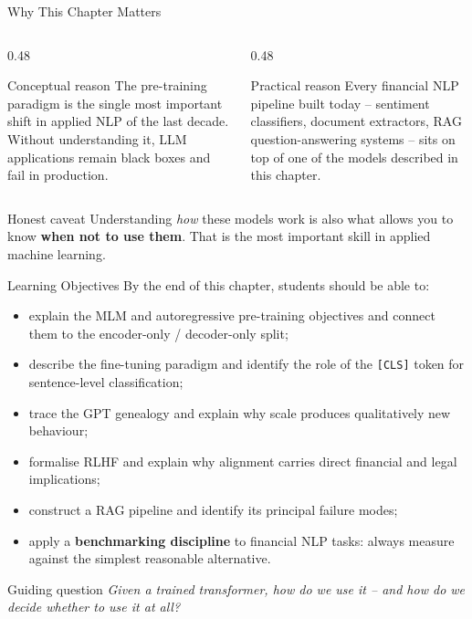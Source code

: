 \documentclass[11pt,aspectratio=169,professionalfonts]{beamer}
\begin{document}
\begin{frame}{Why This Chapter Matters}
  \begin{columns}[T]
    \begin{column}{0.48\linewidth}
      \begin{block}{Conceptual reason}
        The pre-training paradigm is the single most
        important shift in applied NLP of the last decade.
        Without understanding it, LLM applications remain
        black boxes and fail in production.
      \end{block}
    \end{column}
    \begin{column}{0.48\linewidth}
      \begin{alertblock}{Practical reason}
        Every financial NLP pipeline built today --
        sentiment classifiers, document extractors,
        RAG question-answering systems -- sits on top
        of one of the models described in this chapter.
      \end{alertblock}
    \end{column}
  \end{columns}
  \vspace{0.6em}
  \begin{exampleblock}{Honest caveat}
    Understanding \emph{how} these models work is also what allows
    you to know \textbf{when not to use them}.
    That is the most important skill in applied machine learning.
  \end{exampleblock}
\end{frame}
%
%
\begin{frame}{Learning Objectives}
  By the end of this chapter, students should be able to:
  \begin{itemize}
    \item explain the MLM and autoregressive pre-training objectives
          and connect them to the encoder-only / decoder-only split;
    \item describe the fine-tuning paradigm and identify the role of the
          \texttt{[CLS]} token for sentence-level classification;
    \item trace the GPT genealogy and explain why scale produces
          qualitatively new behaviour;
    \item formalise RLHF and explain why alignment carries direct
          financial and legal implications;
    \item construct a RAG pipeline and identify its principal
          failure modes;
    \item apply a \textbf{benchmarking discipline} to financial NLP tasks:
          always measure against the simplest reasonable alternative.
  \end{itemize}
  \vspace{0.3em}
  \begin{alertblock}{Guiding question}
    \emph{Given a trained transformer, how do we use it -- and
    how do we decide whether to use it at all?}
  \end{alertblock}
\end{frame}
\end{document}

